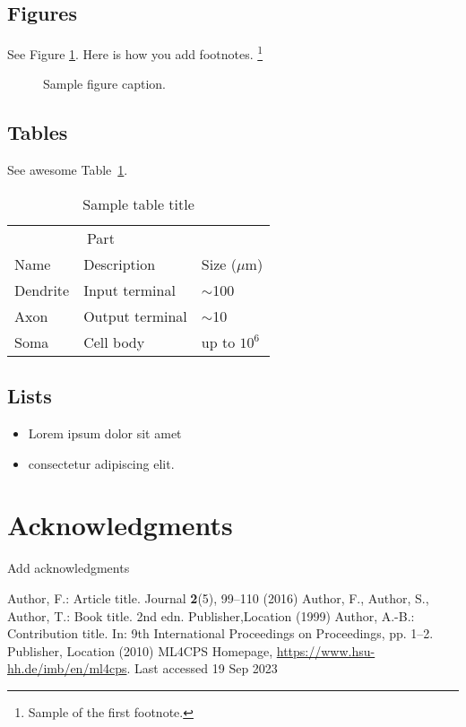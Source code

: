 \documentclass{article}
\begin{document}
\subsection{Figures}
\lipsum[10]
See Figure \ref{fig:fig1}. Here is how you add footnotes. \footnote{Sample of the first footnote.}
\lipsum[11]

\begin{figure}
	\centering
	\fbox{\rule[-.5cm]{4cm}{4cm} \rule[-.5cm]{4cm}{0cm}}
	\caption{Sample figure caption.}
	\label{fig:fig1}
\end{figure}

\subsection{Tables}
See awesome Table~\ref{tab:table}.


\begin{table}
	\caption{Sample table title}
	\centering
	\begin{tabular}{lll}
		\toprule
		\multicolumn{2}{c}{Part}                   \\
		\cmidrule(r){1-2}
		Name     & Description     & Size ($\mu$m) \\
		\midrule
		Dendrite & Input terminal  & $\sim$100     \\
		Axon     & Output terminal & $\sim$10      \\
		Soma     & Cell body       & up to $10^6$  \\
		\bottomrule
	\end{tabular}
	\label{tab:table}
\end{table}

\subsection{Lists}
\begin{itemize}
	\item Lorem ipsum dolor sit amet
	\item consectetur adipiscing elit.
\end{itemize}

\section*{Acknowledgments}
Add acknowledgments




\begin{thebibliography}{99.}
	Author, F.: Article title. Journal \textbf{2}(5), 99--110 (2016)
	Author, F., Author, S., Author, T.: Book title. 2nd edn. Publisher,Location (1999)
	Author, A.-B.: Contribution title. In: 9th International Proceedings on Proceedings, pp. 1--2. Publisher, Location (2010)
	 ML4CPS Homepage, \url{https://www.hsu-hh.de/imb/en/ml4cps}. Last accessed 19 Sep 2023
\end{thebibliography}
\end{document}

